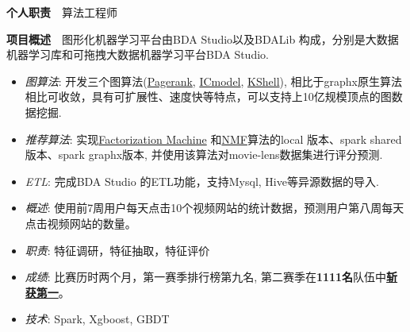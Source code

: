 \documentclass[13pt,a4paper]{resume}
\begin{document}
\textbf{个人职责}\ \ 算法工程师\newline
\begin{onehalfspacing}
\textbf{项目概述}\ \ 图形化机器学习平台由BDA Studio以及BDALib 构成，分别是大数据机器学习库和可拖拽大数据机器学习平台BDA Studio.
\begin{itemize}
  \item {\emph{图算法}}: 开发三个图算法(\href{http://bda.space:18080/BDAStudioMonitor.html?job=0000001-160229111630187-oozie-oozi-W}{Pagerank}, \href{http://bda.space:18080/BDAStudioMonitor.html?job=0000015-160229111630187-oozie-oozi-W}{ICmodel}, \href{http://bda.space:18080/BDAStudioMonitor.html?job=0000206-151222123224608-oozie-oozi-W}{KShell}), 相比于graphx原生算法相比可收敛，具有可扩展性、速度快等特点，可以支持上10亿规模顶点的图数据挖掘.
  \item {\emph{推荐算法}}: 实现\href{http://bda.space:18080/BDAStudioMonitor.html?job=0000009-160229111630187-oozie-oozi-W}{Factorization Machine} 和\href{http://bda.space:18080/BDAStudioMonitor.html?job=0000021-160229111630187-oozie-oozi-W}{NMF}算法的local 版本、spark shared 版本、spark graphx版本, 并使用该算法对movie-lens数据集进行评分预测.
 \item {\emph{ETL}}: 完成BDA Studio 的ETL功能，支持Mysql, Hive等异源数据的导入.
\end{itemize}
\end{onehalfspacing}

\begin{onehalfspacing}
\begin{itemize}
\item {\emph{概述}}: 使用前7周用户每天点击10个视频网站的统计数据，预测用户第八周每天点击视频网站的数量。
\item {\emph{职责}}: 特征调研，特征抽取，特征评价
  \item {\emph{成绩}}: 比赛历时两个月，第一赛季排行榜第九名, 第二赛季在{\textbf{1111名}}队伍中{\textbf{\href{http://bdg.ctyun.cn/algr_detail/PLXBy500006w?pageIndex=al_info}{斩获第一}}}。
  \item {\emph{技术}}: Spark, Xgboost, GBDT
\end{itemize}
\end{onehalfspacing}
\end{document}
